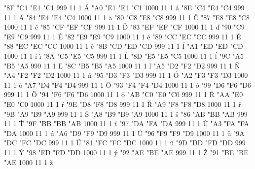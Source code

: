 
  

\setcharcode  "8F  "C1  "E1  "C1   999  11  1  \texaccent \'A
\setcharcode  "A0  "E1  "E1  "C1  1000  11  1  \texaccent \'a
\setcharcode  "8E  "C4  "E4  "C4   999  11  1  \texaccent \"A
\setcharcode  "84  "E4  "E4  "C4  1000  11  1  \texaccent \"a
\setcharcode  "80  "C8  "E8  "C8   999  11  1  \texaccent \v C
\setcharcode  "87  "E8  "E8  "C8  1000  11  1  \texaccent \v c
\setcharcode  "85  "CF  "EF  "CF   999  11  1  \texaccent \v D
\setcharcode  "83  "EF  "EF  "CF  1000  11  1  \texaccent \v d
\setcharcode  "90  "C9  "E9  "C9   999  11  1  \texaccent \'E
\setcharcode  "82  "E9  "E9  "C9  1000  11  1  \texaccent \'e
\setcharcode  "89  "CC  "EC  "CC   999  11  1  \texaccent \v E
\setcharcode  "88  "EC  "EC  "CC  1000  11  1  \texaccent \v e
\setcharcode  "8B  "CD  "ED  "CD   999  11  1  \texaccent \'I
\setcharcode  "A1  "ED  "ED  "CD  1000  11  1  \texaccent \'i  \texaccent \'\i
\setcharcode  "8A  "C5  "E5  "C5   999  11  1  \texaccent \'L
\setcharcode  "8D  "E5  "E5  "C5  1000  11  1  \texaccent \'l
\setcharcode  "9C  "A5  "B5  "A5   999  11  1  \texaccent \v L
\setcharcode  "8C  "B5  "B5  "A5  1000  11  1  \texaccent \v l
\setcharcode  "A5  "D2  "F2  "D2   999  11  1  \texaccent \v N
\setcharcode  "A4  "F2  "F2  "D2  1000  11  1  \texaccent \v n
\setcharcode  "95  "D3  "F3  "D3   999  11  1  \texaccent \'O
\setcharcode  "A2  "F3  "F3  "D3  1000  11  1  \texaccent \'o
\setcharcode  "A7  "D4  "F4  "D4   999  11  1  \texaccent \^O
\setcharcode  "93  "F4  "F4  "D4  1000  11  1  \texaccent \^o
\setcharcode  "99  "D6  "F6  "D6   999  11  1  \texaccent \"O
\setcharcode  "94  "F6  "F6  "D6  1000  11  1  \texaccent \"o
\setcharcode  "AB  "C0  "E0  "C0   999  11  1  \texaccent \'R
\setcharcode  "AA  "E0  "E0  "C0  1000  11  1  \texaccent \'r
\setcharcode  "9E  "D8  "F8  "D8   999  11  1  \texaccent \v R
\setcharcode  "A9  "F8  "F8  "D8  1000  11  1  \texaccent \v r
\setcharcode  "9B  "A9  "B9  "A9   999  11  1  \texaccent \v S
\setcharcode  "A8  "B9  "B9  "A9  1000  11  1  \texaccent \v s
\setcharcode  "86  "AB  "BB  "AB   999  11  1  \texaccent \v T
\setcharcode  "9F  "BB  "BB  "AB  1000  11  1  \texaccent \v t
\setcharcode  "97  "DA  "FA  "DA   999  11  1  \texaccent \'U
\setcharcode  "A3  "FA  "FA  "DA  1000  11  1  \texaccent \'u
\setcharcode  "A6  "D9  "F9  "D9   999  11  1  \texaccent \r U
\setcharcode  "96  "F9  "F9  "D9  1000  11  1  \texaccent \r u
\setcharcode  "9A  "DC  "FC  "DC   999  11  1  \texaccent \"U
\setcharcode  "81  "FC  "FC  "DC  1000  11  1  \texaccent \"u
\setcharcode  "9D  "DD  "FD  "DD   999  11  1  \texaccent \'Y
\setcharcode  "98  "FD  "FD  "DD  1000  11  1  \texaccent \'y
\setcharcode  "92  "AE  "BE  "AE   999  11  1  \texaccent \v Z
\setcharcode  "91  "BE  "BE  "AE  1000  11  1  \texaccent \v z

